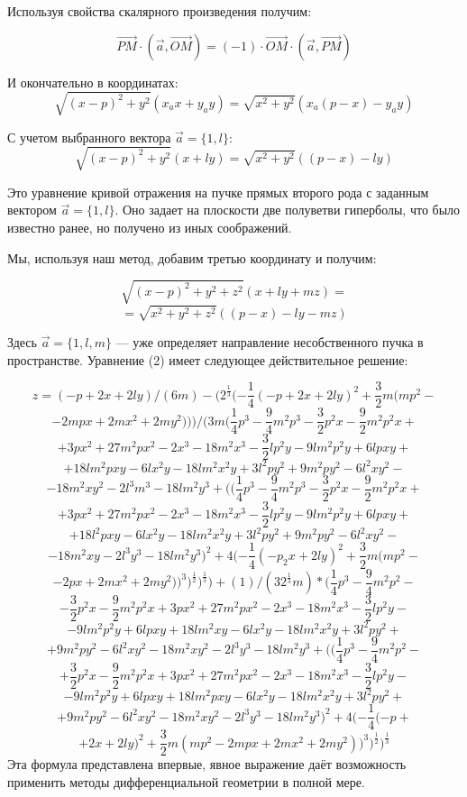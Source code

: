 Используя свойства скалярного произведения получим:

$$\overrightarrow{PM}\cdot(\vec a ,\overrightarrow{OM})=(-1)\cdot\overrightarrow{OM}\cdot(\vec a,\overrightarrow{PM})$$

И  окончательно в координатах:
\[
\sqrt{(x-p)^2+y^2}
\left(x_a x +y_a y\right)
=
\sqrt{x^2+y^2}
\left( x_a (p-x)-y_ay \right)
\]

С учетом выбранного вектора $\vec a = \{ 1,l \}$:
\[
\sqrt{(x-p)^2+y^2}
\left(x+l y\right)
=
\sqrt{x^2+y^2}
\left( (p-x)-l y \right)
\]

Это уравнение кривой отражения на пучке прямых второго рода с заданным вектором $\vec a = \{ 1,l \}$. Оно задает на плоскости две полуветви гиперболы, что было известно ранее, но получено из иных соображений.

Мы, используя наш метод, добавим третью координату и получим:

\[
\sqrt{(x-p)^2+y^2+z^2}
\left(x+l y+m z\right)
= \]
\[=
\sqrt{x^2+y^2+z^2}
\left( (p-x)-l y-m z \right)
\]


Здесь $\vec a = \{ 1,l,m\}$ --- уже определяет направление несобственного пучка в пространстве.
Уравнение (2) имеет следующее действительное решение:

$$z=(-p+2x+2ly)/(6m)-(2^\frac{1}{3}(-\frac{1}{4}(-p+2x+2ly)^2 +\frac{3}{2} m(mp^2-$$
$$-2mpx+2mx^2+2my^2)))/(3m(\frac{1}{4}p^3-\frac{9}{4}m^2p^3-\frac{3}{2}p^2x-\frac{9}{2}m^2p^2x+$$
$$+3px^2+27m^2px^2-2x^3-18m^2x^3-\frac{3}{2}lp^2y-9lm^2p^2y+6lpxy+$$
$$+18lm^2pxy-6lx^2y-18lm^2x^2y+3l^2py^2+9m^2py^2-6l^2xy^2-$$
$$-18m^2xy^2-2l^3m^3-18lm^2y^3+((\frac{1}{4}p^3-\frac{9}{4}m^2p^3-\frac{3}{2}p^2x-\frac{9}{2}m^2p^2x+$$
$$+3px^2+27m^2px^2-2x^3-18m^2x^3-\frac{3}{2}lp^2y-9lm^2p^2y+6lpxy+$$
$$+18l^2pxy-6lx^2y-18lm^2x^2y+3l^2py^2+9m^2py^2-6l^2xy^2-$$
$$-18m^2xy-2l^3y^3-18lm^2y^3)^2+4(-\frac{1}{4}(-p_2x+2ly)^2+\frac{3}{2}m(mp^2-$$
$$-2px+2mx^2+2my^2))^3)^\frac{1}{2})^\frac{1}{3}) +
(1)/(32^\frac{1}{3}m) *
(\frac{1}{4}p^3-\frac{9}{4}m^2p^2-$$
$$-\frac{3}{2}p^2x-\frac{9}{2}m^2p^2x+3px^2+27m^2px^2-2x^3-18m^2x^3-\frac{3}{2}lp^2y-$$
$$-9lm^2p^2y+6lpxy+18lm^2xy-6lx^2y-18lm^2x^2y+3l^2py^2+$$
$$+9m^2py^2-6l^2xy^2-18m^2xy^2-2l^3y^3-18lm^2y^3+((\frac{1}{4}p^3-\frac{9}{4}m^2p^2-$$
$$+\frac{3}{2}p^2x-\frac{9}{2}m^2p^2x+3px^2+27m^2px^2-2x^3-18m^2x^3-\frac{3}{2}lp^2y-$$
$$-9lm^2p^2y+6lpxy+18lm^2pxy-6lx^2y-18lm^2x^2y+3l^2py^2+$$
$$+9m^2py^2-6l^2xy^2-18m^2xy^2-2l^3y^3-18lm^2y^3)^2+4(-\frac{1}{4}(-p+$$
$$+2x+2ly)^2+\frac{3}{2}m(mp^2-2mpx+2mx^2+2my^2))^3)^\frac{1}{2})^\frac{1}{3}$$
Эта формула представлена впервые, явное выражение даёт возможность применить методы дифференциальной геометрии в полной мере.

